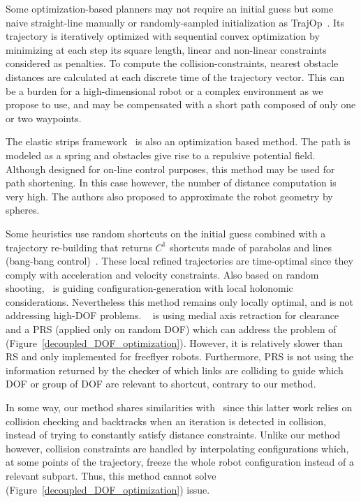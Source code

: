 \documentclass{tADR2e}
\begin{document}
Some optimization-based planners may not require an initial guess but some naive 
straight-line manually or randomly-sampled initialization as 
TrajOp~\cite{SchulmanConvexOptim}. Its trajectory is iteratively optimized with 
sequential convex optimization by minimizing at each step its square length, 
linear and non-linear constraints considered as penalties. To compute the 
collision-constraints, nearest obstacle distances are calculated at each discrete 
time of the trajectory vector. This can be a burden for a high-dimensional robot 
or a complex environment as we propose to use, and may be compensated with a 
short path composed of only one or two waypoints.


The elastic strips framework~\cite{BrockElasticStrips} is also an optimization 
based method. The path is modeled as a spring and obstacles give rise to a 
repulsive potential field. Although designed for on-line control purposes, this 
method may be used for path shortening. In this case however, the number of 
distance computation is very high. The authors also proposed to approximate the 
robot geometry by spheres.

Some heuristics use random shortcuts on the initial guess combined with a 
trajectory re-building that returns ${C}^1$ shortcuts made of parabolas and lines 
(bang-bang control)~\cite{HauserFastSmooth}. These local refined trajectories 
are time-optimal since they comply with acceleration and velocity constraints. 
Also based on random shooting,~\cite{Guernane2011} is guiding 
configuration-generation with local holonomic considerations. 
Nevertheless this method remains only 
locally optimal, and is not addressing high-DOF problems.
~\cite{Geraerts04clearancebased} is 
using medial axis retraction for clearance and a PRS (applied only on random DOF) 
which can address the problem of (Figure~\ref{decoupled_DOF_optimization}). However, it is 
relatively slower than RS and only implemented for freeflyer robots. 
Furthermore, PRS is not using the information returned by 
the checker of which links are colliding to guide which DOF or group of DOF are 
relevant to shortcut, contrary to our method.

In some way, our method shares similarities with~\cite{PanSmoothSplineShort} 
since this latter work relies on collision checking and backtracks when an 
iteration is detected in collision, instead of trying to constantly satisfy 
distance constraints. Unlike our method however, collision constraints are 
handled by interpolating configurations which, at some points of the trajectory, 
freeze the whole robot configuration instead of a relevant subpart. Thus, this 
method cannot solve (Figure~\ref{decoupled_DOF_optimization}) issue.
\end{document}
